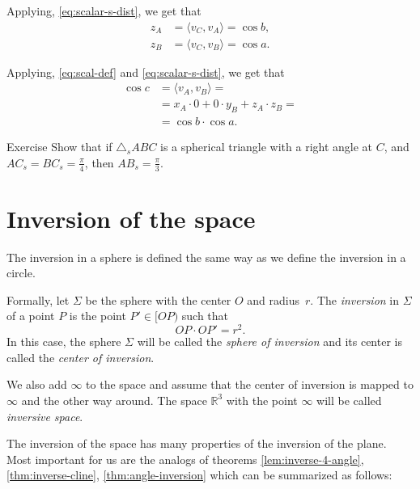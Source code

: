 Applying, \ref{eq:scalar-s-dist},
we get that
\begin{align*}
z_A&=\langle v_C,v_A\rangle
=\cos b,
\\
z_B&=\langle v_C,v_B\rangle
=\cos a.
\end{align*}

Applying, \ref{eq:scal-def} and \ref{eq:scalar-s-dist}, we get that
\begin{align*}
\cos c &=\langle v_A,v_B\rangle=
\\
&=x_A\cdot 0+0\cdot y_B+z_A\cdot z_B=
\\
&=\cos b\cdot\cos a.
\end{align*}
\qedsf

\begin{thm}{Exercise}\label{ex:2(pi/4)=pi/3}
Show that 
if $\triangle_sABC$ is a spherical triangle with a right angle at $C$,
and $AC_s=BC_s=\tfrac\pi4$, then $AB_s=\tfrac\pi3$.
\end{thm}

\section*{Inversion of the space}

The inversion in a sphere is defined the same way as we define the inversion in a circle.

Formally, let $\Sigma$ be the sphere with the center $O$ and radius~$r$.
The \emph{inversion} in $\Sigma$ of a point $P$ is the point $P'\in[OP)$ such that
$$OP\cdot OP'=r^2.$$
In this case, the sphere $\Sigma$  will be called the 
\emph{sphere of inversion} 
and its center is called the \emph{center of inversion}.

We also add $\infty$ to the space and assume that the center of inversion is mapped to $\infty$ and the other way around. 
The space $\mathbb{R}^3$ with the point $\infty$ will be called \emph{inversive space}.

The inversion of the space 
has many properties 
of the inversion of the plane.
Most important for us are the analogs of theorems \ref{lem:inverse-4-angle}, \ref{thm:inverse-cline}, \ref{thm:angle-inversion} which can be summarized as follows:

